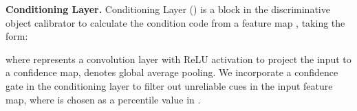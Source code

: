 \documentclass[sigconf]{acmart}
\begin{document}
\noindent\textbf{Conditioning Layer.}\label{sec:method/relational_modulation_network/conditioning_layer} Conditioning Layer () is a block in the discriminative object calibrator to calculate the condition code  from a feature map , taking the form:
\begin{small}

\end{small}
where  represents a  convolution layer with ReLU activation to project the input  to a confidence map,  denotes global average pooling. We incorporate a confidence gate  in the conditioning layer to filter out unreliable cues in the input feature map, where  is chosen as a percentile value in .


\newcommand{\tabincell}[2]{\begin{tabular}{@{}#1@{}}#2\end{tabular}}
\end{document}
